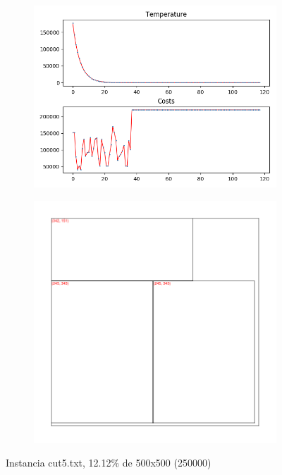 \begin{figure}
\centering
\begin{subfigure}{.5\textwidth}
  \centering
  \includegraphics[width=1\linewidth]{results/cut5/3/plot}
  \label{fig:sub1}
\end{subfigure}%
\begin{subfigure}{.5\textwidth}
  \centering
  \includegraphics[width=1\linewidth]{results/cut5/3/cut}
  \label{fig:sub2}
\end{subfigure}
\caption{Instancia cut5.txt, 12.12\% de 500x500 (250000)}
\label{fig:test}
\end{figure}


